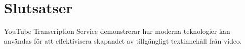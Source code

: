 \chapter{Slutsatser}
YouTube Transcription Service demonstrerar hur moderna teknologier kan
användas för att effektivisera skapandet av tillgängligt textinnehåll från
video.
